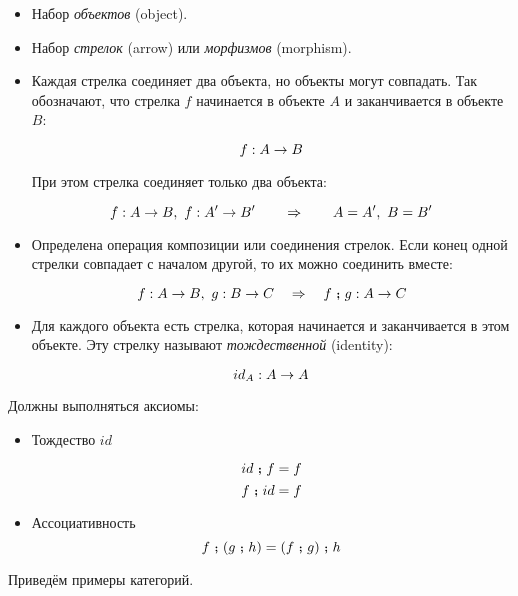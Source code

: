 \begin{itemize}
\item Набор \emph{объектов} (object).
\item Набор \emph{стрелок} (arrow) или \emph{морфизмов} (morphism).
\item Каждая стрелка соединяет два объекта, но объекты могут совпадать. 
    Так обозначают, что стрелка $f$ начинается в объекте $A$ и заканчивается 
    в \mbox{объекте $B$}:

    \[ f : A \rightarrow B \]

    При этом стрелка соединяет только два объекта:

    \[ f : A \rightarrow B,\ f : A' \rightarrow B' \qquad \Rightarrow \qquad A=A',\ B=B' \]

\item Определена операция композиции или соединения стрелок. 
    Если конец одной стрелки совпадает с началом другой,
    то их можно соединить вместе:

    \[ f:A \rightarrow B,\ g : B\rightarrow C \quad \Rightarrow \quad f \footnotesize\textbf{~;~}\normalsize g : A \rightarrow C \]

\item Для каждого объекта есть стрелка, которая начинается
    и заканчивается в этом объекте. Эту стрелку называют
    \emph{тождественной} (identity):

    \[ id_A : A \rightarrow A \]

\end{itemize}

Должны выполняться аксиомы:

\begin{itemize}
        
\item Тождество $id$

    \[ id \footnotesize\textbf{~;~}\normalsize f = f \]
    \[ f \footnotesize\textbf{~;~}\normalsize id = f \]

\item Ассоциативность \Co
    \[ f \footnotesize\textbf{~;~}\normalsize (g \footnotesize\textbf{~;~}\normalsize h) = (f \footnotesize\textbf{~;~}\normalsize g) \footnotesize\textbf{~;~}\normalsize h \]
\end{itemize}

Приведём примеры категорий. 

